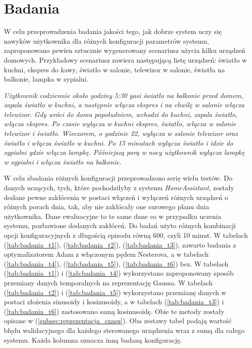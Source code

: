 \chapter{Badania}

W celu przeprowadzenia badania jakości tego, jak dobrze system uczy się nawyków użytkownika dla różnych konfiguracji parametrów systemu, zaproponowano pewien sztucznie wygenerowany scenariusz użycia kilku urządzeń domowych. Przykładowy scenariusz zawiera następującą listę urządzeń: światło w kuchni, ekspres do kawy, światło w salonie, telewizor w salonie, światła na balkonie, lampka w sypialni.

\textit{Użytkownik codziennie około godziny 5:30 gasi światło na balkonie przed domem, zapala światło w kuchni, a następnie włącza ekspres i na chwilę w salonie włącza telewizor. Gdy wróci do domu popołudniem, wchodzi do kuchni, zapala światło, włącza ekspres. Po czasie wyłącza w kuchni ekspres, światło, włącza w salonie telewizor i światło. Wieczorem, o godzinie 22, wyłącza w salonie telewizor oraz światło i włącza światło w kuchni.
Po 15 minutach wyłącza światło i idzie do sypialni gdzie włącza lampkę. Późniejszą porą w nocy użytkownik wyłącza lampkę w sypialni i włącza światło na balkonie.}

W celu zbadania różnych konfiguracji przeprowadzono serię wielu testów. Do danych uczących, tych, które pochodziłyby z systemu \textit{HomeAssistant}, zostały dodane pewne zakłócenia w postaci włączeń i wyłączeń różnych urządzeń o różnych porach dnia, tak, aby nie zakłócały one surowego planu dnia użytkownika. Dane ewaluacyjne to te same dane co w przypadku uczenia systemu, pozbawione dodanych zakłóceń. Do badań użyto różnych kombinacji opcji konfiguracyjnych z długością epizodu równą 600, czyli 10 minut. W tabelach (\ref{tab:badania_t1}), (\ref{tab:badania_t2}), (\ref{tab:badania_t3}), zawarto badania z optymalizatorem Adam z włączonym pędem Nesterova, a w tabelach (\ref{tab:badania_t4}), (\ref{tab:badania_t5}), (\ref{tab:badania_t6}) bez. W tabelach (\ref{tab:badania_t1}) i (\ref{tab:badania_t4}) wykorzystano zaproponowany sposób przemiany danych temporalnych na reprezentację Gaussa. W tabelach (\ref{tab:badania_t2}) i (\ref{tab:badania_t5}) wykorzystano przemianę danych w postaci złożenia sinusoidy i kosinusoidy, a w tabelach (\ref{tab:badania_t3}) i (\ref{tab:badania_t6}) zastosowano samą kosinusoidę. Obie te metody zostały opisane w (\ref{subsec:reprezentacja_czasu}). Oba zestawy tabel podają wartość błędu walidacyjnego dla każdego sterowanego urządzenia wraz z sumą dla całego systemu. Każda kolumna oznacza inną badaną konfigurację.

